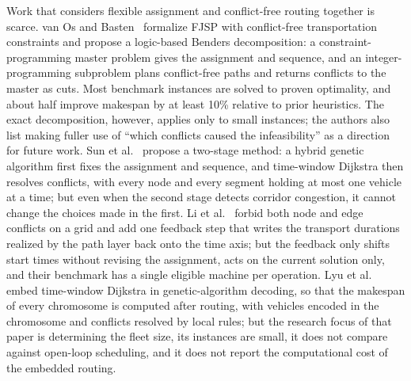 \documentclass[manuscript,screen,review]{acmart}
\begin{document}
Work that considers flexible assignment and conflict-free routing together is scarce.
van Os and Basten~\cite{vanos2026exact} formalize FJSP with conflict-free transportation constraints and propose a logic-based Benders decomposition: a constraint-programming master problem gives the assignment and sequence, and an integer-programming subproblem plans conflict-free paths and returns conflicts to the master as cuts. Most benchmark instances are solved to proven optimality, and about half improve makespan by at least 10\% relative to prior heuristics. The exact decomposition, however, applies only to small instances; the authors also list making fuller use of ``which conflicts caused the infeasibility'' as a direction for future work.
Sun et al.~\cite{sun2023integrated} propose a two-stage method: a hybrid genetic algorithm first fixes the assignment and sequence, and time-window Dijkstra then resolves conflicts, with every node and every segment holding at most one vehicle at a time; but even when the second stage detects corridor congestion, it cannot change the choices made in the first.
Li et al.~\cite{li2026framework} forbid both node and edge conflicts on a grid and add one feedback step that writes the transport durations realized by the path layer back onto the time axis; but the feedback only shifts start times without revising the assignment, acts on the current solution only, and their benchmark has a single eligible machine per operation.
Lyu et al.~\cite{lyu2019approach} embed time-window Dijkstra in genetic-algorithm decoding, so that the makespan of every chromosome is computed after routing, with vehicles encoded in the chromosome and conflicts resolved by local rules; but the research focus of that paper is determining the fleet size, its instances are small, it does not compare against open-loop scheduling, and it does not report the computational cost of the embedded routing.
\end{document}
